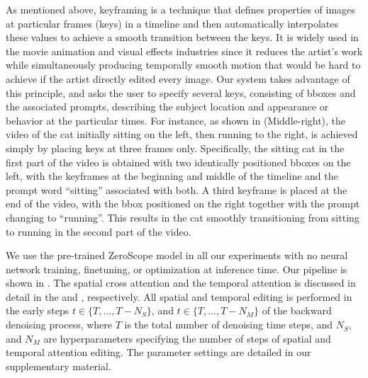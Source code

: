 As mentioned above, keyframing \cite{keyframe} is a technique that defines properties of images at particular frames (keys) in a timeline and then automatically interpolates these values to achieve a smooth transition between the keys. It is widely used in the movie animation and visual effects industries since it reduces the artist's work while simultaneously producing temporally smooth motion that would be hard to achieve if the artist directly edited every image.
Our system takes %
advantage of this principle, and asks the user to specify several keys, consisting of bboxes and the associated prompts, describing the subject location and appearance or behavior at the particular times. For instance, as shown in  (Middle-right), the video of the cat initially sitting on the left, then running to the right, is achieved simply by placing keys at three frames only. Specifically, the sitting cat in the first part of the video is obtained with two identically positioned bboxes on the left, with the keyframes at the beginning and middle of the timeline and the prompt word ``sitting'' associated with both. A third keyframe is placed at the end of the video, with the bbox positioned on the right together with the prompt changing to ``running''. This results in the cat smoothly transitioning from sitting to running in the second part of the video.


We use the pre-trained ZeroScope model \cite{zeroscope} in all our experiments with no neural network training, finetuning, or optimization at inference time. Our pipeline is shown in . The spatial cross attention and the temporal attention is discussed in detail in the  and , respectively. %
All spatial and temporal editing is performed in the early steps $t \in \{T,...,T-N_S\}$, and $t \in \{T,...,T-N_M\}$ of the backward denoising process, where $T$ is the total number of denoising time steps, and $N_S$, and $N_M$ are hyperparameters specifying the number of steps of spatial and temporal attention editing. The parameter settings are detailed in our supplementary material.

